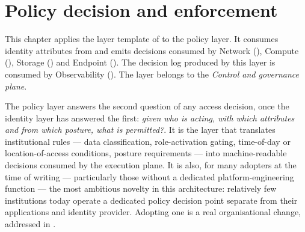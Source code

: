 
\chapter{Policy decision and enforcement}
\label{ch:policy}

\begin{caveatbox}[Dependencies]
\noindent This chapter applies the layer template of
 to the policy layer. It consumes identity
attributes from  and emits decisions consumed
by Network (), Compute
(), Storage () and
Endpoint (). The decision log produced by this
layer is consumed by Observability ().
The layer belongs to the \emph{Control and governance plane}.
\end{caveatbox}

The policy layer answers the second question of any access decision,
once the identity layer has answered the first: \emph{given who is
acting, with which attributes and from which posture, what is
permitted?}. It is the layer that translates institutional rules ---
data classification, role-activation gating, time-of-day or
location-of-access conditions, posture requirements --- into
machine-readable decisions consumed by the execution plane. It is
also, for many adopters at the time of writing --- particularly
those without a dedicated platform-engineering function --- the most
ambitious novelty in this architecture: relatively few institutions
today operate a dedicated policy decision point separate from their
applications and identity provider. Adopting one is a real
organisational change, addressed in .

